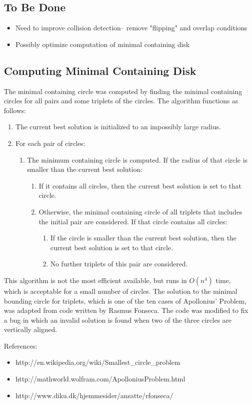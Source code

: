 \documentclass[a4paper]{article}
\begin{document}
 \subsection{To Be Done}
  \begin{multicols}{2}
 \begin{itemize}
\item Need to improve collision detection-- remove "flipping" and overlap conditions
\item Possibly optimize computation of minimal containing disk
\end{itemize}
\end{multicols}
 
\subsection{Computing Minimal Containing Disk}
The minimal containing circle was computed by finding the minimal containing circles for all pairs and some triplets of the circles.
The algorithm functions as follows:
\begin{enumerate}
	\item The current best solution is initialized to an impossibly large radius.
	\item For each pair of circles:
	\begin{enumerate}
		\item The minimum containing circle is computed.  If the radius of that circle is smaller than the current best solution:
		\begin{enumerate}
			\item If it contains all circles, then the current best solution is set to that circle.
			\item Otherwise, the minimal containing circle of all triplets that includes the initial pair are considered.  If that circle contains all circles:
			\begin{enumerate}
				\item If the circle is smaller than the current best solution, then the current best solution is set to that circle.
				\item No further triplets of this pair are considered.
			\end{enumerate}
		\end{enumerate}
	\end{enumerate}
\end{enumerate}

This algorithm is not the most efficient available, but runs in $O(n^4)$ time, which is acceptable for a small number of circles.
The solution to the minimal bounding circle for triplets, which is one of the ten cases of Apollonius' Problem, was adapted from code written by Rasmus Fonseca.
The code was modified to fix a bug in which an invalid solution is found when two of the three circles are vertically aligned.

References:
\begin{itemize}
	\item http://en.wikipedia.org/wiki/Smallest\_circle\_problem
	\item http://mathworld.wolfram.com/ApolloniusProblem.html
	\item http://www.diku.dk/hjemmesider/ansatte/rfonseca/
\end{itemize}
\end{document}
